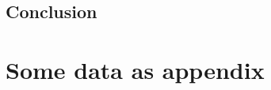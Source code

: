 \documentclass[a4paper,11pt,fleqn]{report}
\begin{document}
\section{Conclusion}
\acresetall
  


\appendix
\chapter{Some data as appendix}
\end{document}
